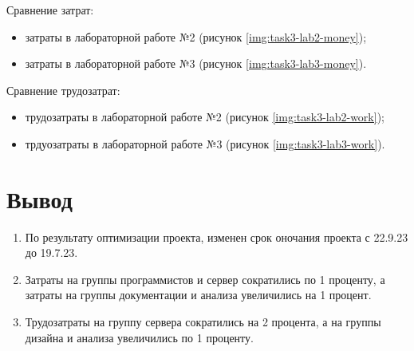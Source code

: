 Сравнение затрат:

\begin{itemize}
    \item затраты в лабораторной работе №2 (рисунок \ref{img:task3-lab2-money});
    \item затраты в лабораторной работе №3 (рисунок \ref{img:task3-lab3-money}).
\end{itemize}


Сравнение трудозатрат:

\begin{itemize}
    \item трудозатраты в лабораторной работе №2 (рисунок \ref{img:task3-lab2-work});
    \item трдуозатраты в лабораторной работе №3 (рисунок \ref{img:task3-lab3-work}).
\end{itemize}


\section*{Вывод}

\begin{enumerate}
    \item По результату оптимизации проекта, изменен срок оночания проекта с 22.9.23 до 19.7.23.
    \item Затраты на группы программистов и сервер сократились по 1 проценту, а затраты на группы документации и анализа увеличились на 1 процент.
    \item Трудозатраты на группу сервера сократились на 2 процента, а на группы дизайна и анализа увеличились по 1 проценту.
\end{enumerate}

